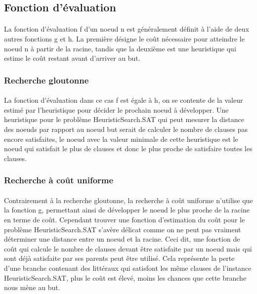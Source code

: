 \subsection{Fonction d'évaluation}
\paragraph{}
La fonction d’évaluation f d’un noeud n est généralement définit à l’aide de deux autres fonctions g et h. La première désigne le coût nécessaire pour atteindre le noeud n à partir de la racine, tandis que la deuxième est une heuristique qui estime le coût restant avant d’arriver au but.
\subsubsection{Recherche gloutonne}
\paragraph{}
La fonction d’évaluation dans ce cas f est égale à h, on se contente de la valeur estimé par l’heuristique pour décider le prochain noeud à développer. Une heuristique pour le problème HeuristicSearch.SAT qui peut mesurer la distance des noeuds par rapport au noeud but serait de calculer le nombre de clauses pas encore satisfaites, le noeud avec la valeur minimale de cette heuristique est le noeud qui satisfait le plus de clauses et donc le plus proche de satisfaire toutes les clauses.
\subsubsection{Recherche à coût uniforme}
\paragraph{}
Contrairement à la recherche gloutonne, la recherche à coût uniforme n’utilise que la fonction g, permettant ainsi de développer le noeud le plus proche de la racine en terme de coût. Cependant trouver une fonction d’estimation du coût pour le problème HeuristicSearch.SAT s’avère délicat comme on ne peut pas vraiment déterminer une distance entre un noeud et la racine. Ceci dit, une fonction de coût qui calcule le nombre de clauses devant être satisfaite par un noeud mais qui sont déjà satisfaite par ses parents peut être utilisé. Cela représente la perte d’une branche contenant des littéraux qui satisfont les même clauses de l’instance HeuristicSearch.SAT, plus le coût est élevé, moins les chances que cette branche nous mène au but.


